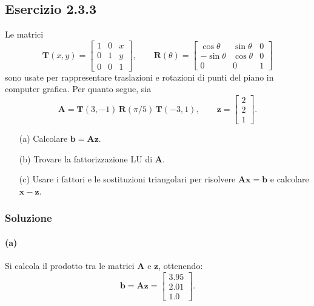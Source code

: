 \documentclass[letterpaper, 12pt]{article}
\begin{document}
\subsection{Esercizio 2.3.3}
Le matrici
\[
\mathbf{T}(x,y) = \begin{bmatrix}
    1 & 0 & x \\ 
    0 & 1 & y \\ 
    0 & 0 & 1
\end{bmatrix},\qquad
\mathbf{R}(\theta) = \begin{bmatrix}
    \cos\theta & \sin \theta & 0 \\ 
    -\sin\theta & \cos \theta & 0 \\
    0 & 0 & 1
\end{bmatrix}
\]
sono usate per rappresentare traslazioni e rotazioni di punti del piano in computer grafica. Per quanto segue, sia
\[
\mathbf{A} = \mathbf{T}(3,-1)\,\mathbf{R}(\pi/5)\,\mathbf{T}(-3,1), \qquad 
\mathbf{z} = \begin{bmatrix}
    2 \\ 2 \\ 1
\end{bmatrix}.
\]

\begin{enumerate}
        \item[(a)] Calcolare $\mathbf{b} = \mathbf{A}\mathbf{z}$.
        \item[(b)] Trovare la fattorizzazione LU di $\mathbf{A}$.
        \item[(c)] Usare i fattori e le sostituzioni triangolari per risolvere $\mathbf{A}\mathbf{x} = \mathbf{b}$ 
                   e calcolare $\mathbf{x} - \mathbf{z}$.
\end{enumerate}

\subsubsection{Soluzione}
\paragraph{(a) } Si calcola il prodotto tra le matrici $\mathbf{A}$ e $\mathbf{z}$, ottenendo:
\begin{equation}
    \mathbf{b} = \mathbf{A}\mathbf{z} = \begin{bmatrix}
        3.95 \\
        2.01 \\
        1.0
    \end{bmatrix}. 
\end{equation}
\end{document}
